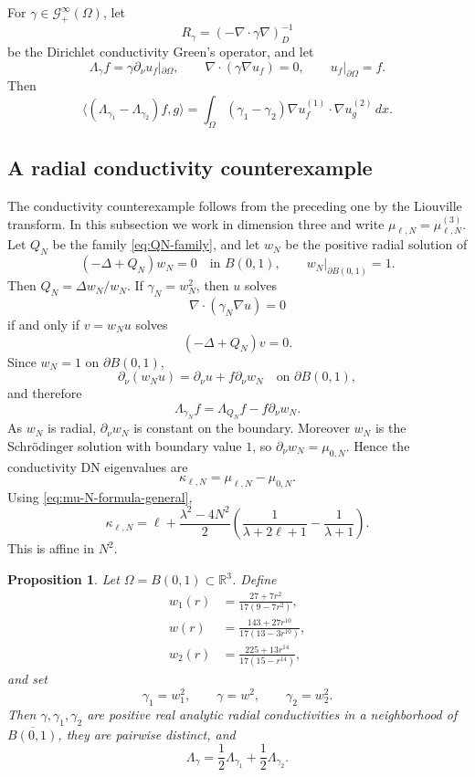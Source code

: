 \documentclass[11pt]{article}
\newcommand{\OmegaD}{\Omega}
\newcommand{\R}{\mathbb R}
\newcommand{\la}{\langle}
\newcommand{\ra}{\rangle}
\theoremstyle{plain}
\newtheorem{proposition}[theorem]{Proposition}
\theoremstyle{definition}
\theoremstyle{remark}
\begin{document}
For $\gamma\in\mathcal G_+^\infty(\OmegaD)$, let
\[
  R_\gamma=(-\nabla\cdot\gamma\nabla)^{-1}_{D}
\]
be the Dirichlet conductivity Green's operator, and let
\[
  \Lambda_\gamma f=\gamma\partial_\nu u_f|_{\partial\OmegaD},
  \qquad
  \nabla\cdot(\gamma\nabla u_f)=0,
  \qquad
  u_f|_{\partial\OmegaD}=f.
\]
Then
\begin{equation}\label{eq:Alessandrini-gamma}
  \la(\Lambda_{\gamma_1}-\Lambda_{\gamma_2})f,g\ra
  =\int_\OmegaD (\gamma_1-\gamma_2)
  \nabla u_f^{(1)}\cdot\nabla u_g^{(2)}\,dx.
\end{equation}

\subsection{A radial conductivity counterexample}

The conductivity counterexample follows from the preceding one by the Liouville transform.  In this subsection we work in dimension three and write $\mu_{\ell,N}=\mu_{\ell,N}^{(3)}$.  Let $Q_N$ be the family \eqref{eq:QN-family}, and let $w_N$ be the positive radial solution of
\[
  (-\Delta+Q_N)w_N=0\quad\text{in }B(0,1),
  \qquad w_N|_{\partial B(0,1)}=1.
\]
Then $Q_N=\Delta w_N/w_N$.  If $\gamma_N=w_N^2$, then $u$ solves
\[
  \nabla\cdot(\gamma_N\nabla u)=0
\]
if and only if $v=w_Nu$ solves
\[
  (-\Delta+Q_N)v=0.
\]
Since $w_N=1$ on $\partial B(0,1)$,
\[
  \partial_\nu(w_Nu)=\partial_\nu u+f\partial_\nu w_N
  \quad\text{on }\partial B(0,1),
\]
and therefore
\[
  \Lambda_{\gamma_N}f=\Lambda_{Q_N}f-f\partial_\nu w_N.
\]
As $w_N$ is radial, $\partial_\nu w_N$ is constant on the boundary.  Moreover $w_N$ is the Schr\"odinger solution with boundary value $1$, so $\partial_\nu w_N=\mu_{0,N}$.  Hence the conductivity DN eigenvalues are
\begin{equation}\label{eq:kappa-from-mu}
  \kappa_{\ell,N}=\mu_{\ell,N}-\mu_{0,N}.
\end{equation}
Using \eqref{eq:mu-N-formula-general},
\begin{equation}\label{eq:kappa-N-formula}
  \kappa_{\ell,N}
  =\ell+\frac{\lambda^2-4N^2}{2}
  \left(\frac1{\lambda+2\ell+1}-\frac1{\lambda+1}\right).
\end{equation}
This is affine in $N^2$.

\begin{proposition}\label{prop:conductivity-DN-counterexample}
Let $\OmegaD=B(0,1)\subset\R^3$.  Define
\begin{align*}
 w_1(r)&=\frac{27+7r^2}{17(9-7r^2)},\\[3pt]
 w(r)&=\frac{143+27r^{10}}{17(13-3r^{10})},\\[3pt]
 w_2(r)&=\frac{225+13r^{14}}{17(15-r^{14})},
\end{align*}
and set
\[
  \gamma_1=w_1^2,
  \qquad
  \gamma=w^2,
  \qquad
  \gamma_2=w_2^2.
\]
Then $\gamma,\gamma_1,\gamma_2$ are positive real analytic radial conductivities in a neighborhood of $\overline{B(0,1)}$, they are pairwise distinct, and
\begin{equation}\label{eq:conductivity-half-counterexample}
  \Lambda_\gamma=\frac12\Lambda_{\gamma_1}+\frac12\Lambda_{\gamma_2}.
\end{equation}
\end{proposition}
\end{document}
